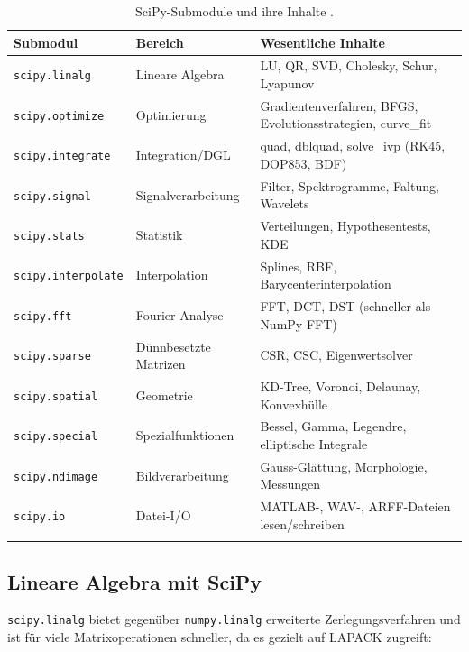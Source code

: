 \documentclass[12pt, a4paper]{article}
\begin{document}
\begin{center}
\begin{longtable}{p{4.5cm}p{3.5cm}p{5.5cm}}
  \toprule
  \textbf{Submodul} & \textbf{Bereich} & \textbf{Wesentliche Inhalte}\\
  \midrule
  \endhead
  \texttt{scipy.linalg}     & Lineare Algebra   & LU, QR, SVD, Cholesky, Schur, Lyapunov \\
  \texttt{scipy.optimize}   & Optimierung       & Gradientenverfahren, BFGS, Evolutionsstrategien, curve\_fit \\
  \texttt{scipy.integrate}  & Integration/DGL   & quad, dblquad, solve\_ivp (RK45, DOP853, BDF) \\
  \texttt{scipy.signal}     & Signalverarbeitung & Filter, Spektrogramme, Faltung, Wavelets \\
  \texttt{scipy.stats}      & Statistik         & Verteilungen, Hypothesentests, KDE \\
  \texttt{scipy.interpolate}& Interpolation     & Splines, RBF, Barycenterinterpolation \\
  \texttt{scipy.fft}        & Fourier-Analyse   & FFT, DCT, DST (schneller als NumPy-FFT) \\
  \texttt{scipy.sparse}     & Dünnbesetzte Matrizen & CSR, CSC, Eigenwertsolver \\
  \texttt{scipy.spatial}    & Geometrie         & KD-Tree, Voronoi, Delaunay, Konvexhülle \\
  \texttt{scipy.special}    & Spezialfunktionen & Bessel, Gamma, Legendre, elliptische Integrale \\
  \texttt{scipy.ndimage}    & Bildverarbeitung  & Gauss-Glättung, Morphologie, Messungen \\
  \texttt{scipy.io}         & Datei-I/O         & MATLAB-, WAV-, ARFF-Dateien lesen/schreiben \\
  \bottomrule
  \caption{SciPy-Submodule und ihre Inhalte \cite{virtanen2020scipy}.}
  \label{tab:scipy_modules}
\end{longtable}
\end{center}

\subsection{Lineare Algebra mit SciPy}
\label{subsec:scipy-linalg}

\texttt{scipy.linalg} bietet gegenüber \texttt{numpy.linalg} erweiterte
Zerlegungsverfahren und ist für viele Matrixoperationen schneller, da
es gezielt auf LAPACK zugreift:
\end{document}

